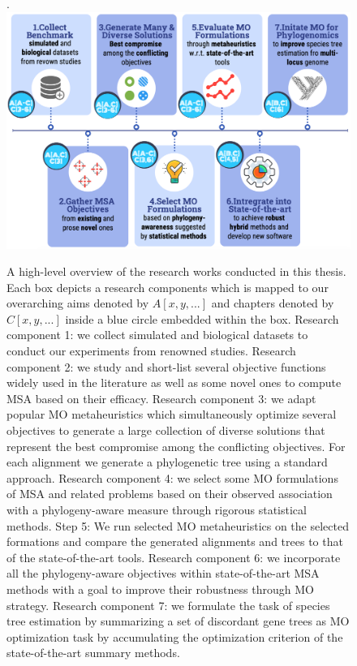 \begin{figure}[!htbp]
	\centering
.	\includegraphics[width=1.0\textwidth]{Figure/research-overview-new}
	\caption[A high-level overview of the research works conducted in this thesis]{A high-level overview of the research works conducted in this thesis. Each box depicts a research components which is mapped to our overarching aims denoted by $A[x,y,...]$ and chapters denoted by $C[x,y,...]$ inside a blue circle embedded within the box.
		Research component 1: we collect simulated and biological datasets to conduct our experiments from renowned studies.
		Research component 2: we study and short-list several objective functions widely used in the literature as well as some novel ones to compute MSA based on their efficacy.
		Research component 3: we adapt popular MO metaheuristics which simultaneously optimize several objectives to generate a large collection of diverse solutions that represent the best compromise among the conflicting objectives. For each alignment we generate a phylogenetic tree using a standard approach.
		Research component 4: we select some MO formulations of MSA and related problems based on their observed association with a phylogeny-aware measure through rigorous statistical methods.
		Step 5: We run selected  MO metaheuristics on the selected formations and compare the generated alignments and trees to that of the state-of-the-art tools.
		Research component 6: we incorporate all the phylogeny-aware objectives within state-of-the-art MSA methods with a goal to improve their robustness through MO strategy.
		Research component 7: we formulate the task of species tree estimation by summarizing a set of discordant gene trees as MO optimization task by accumulating the optimization criterion of the state-of-the-art summary methods.}
	
	\label{fig:research-workflow}
	
\end{figure}

